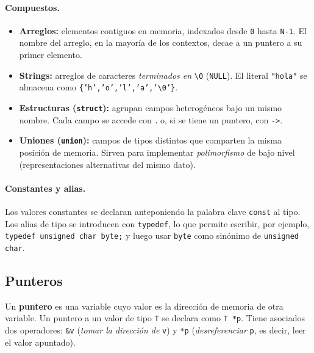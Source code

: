 \documentclass[11pt,a4paper]{article}
\begin{document}
\paragraph{Compuestos.}
\begin{itemize}[leftmargin=*]
    \item \textbf{Arreglos:} elementos contiguos en memoria,
        indexados desde \texttt{0} hasta \texttt{N-1}. El nombre del
        arreglo, en la mayoría de los contextos, decae a un puntero a
        su primer elemento.
    \item \textbf{Strings:} arreglos de caracteres \emph{terminados
        en} \texttt{\textbackslash 0} (\texttt{NULL}). El literal
        \texttt{"hola"} se almacena como
        \texttt{\{'h','o','l','a','\textbackslash 0'\}}.
    \item \textbf{Estructuras (\texttt{struct}):} agrupan campos
        heterogéneos bajo un mismo nombre. Cada campo se accede con
        \texttt{.}\,o, si se tiene un puntero, con \texttt{->}.
    \item \textbf{Uniones (\texttt{union}):} campos de tipos
        distintos que comparten la misma posición de memoria. Sirven
        para implementar \emph{polimorfismo} de bajo nivel
        (representaciones alternativas del mismo dato).
\end{itemize}

\paragraph{Constantes y alias.}
Los valores constantes se declaran anteponiendo la palabra clave
\texttt{const} al tipo. Los alias de tipo se introducen con
\texttt{typedef}, lo que permite escribir, por ejemplo,
\texttt{typedef unsigned char byte;} y luego usar \texttt{byte} como
sinónimo de \texttt{unsigned char}.

\subsection{Punteros}

\begin{definicion}
Un \textbf{puntero} es una variable cuyo valor es la dirección de
memoria de otra variable. Un puntero a un valor de tipo \texttt{T} se
declara como \texttt{T *p}. Tiene asociados dos operadores:
\texttt{\&v} (\emph{tomar la dirección de} \texttt{v}) y
\texttt{*p} (\emph{desreferenciar} \texttt{p}, es decir, leer el
valor apuntado).
\end{definicion}
\end{document}
